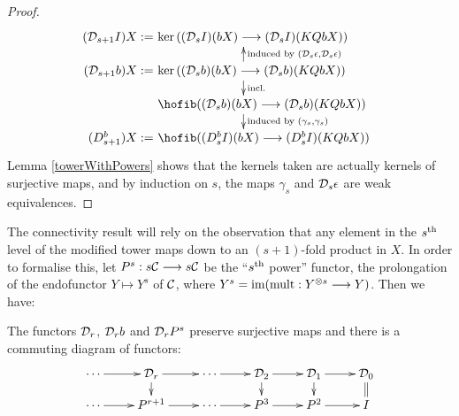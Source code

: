 \documentclass[11pt]{amsart}
\theoremstyle{plain}
\newcommand{\caldup}[1]{\calD_{\smash{#1}}}
\begin{document}
\begin{proof}
\[\qquad \quad \xymatrix@R=4mm{
\makebox[0cm][r]{$(\caldup{s+1}I)X:=\,$}\makebox[5cm][l]{$\,\ker((\caldup{s}I)(bX)\to (\caldup{s}I)(KQbX))$}\\
\makebox[0cm][r]{$(\caldup{s+1}b)X:=\,$}\makebox[5cm][l]{$\,\ker((\caldup{s}b)(bX)\to (\caldup{s}b)(KQbX))$}\ar[d]^-{\textup{incl.}}_-{}%
\ar[u]_-{\textup{induced by }(\caldup{s}\epsilon,\caldup{s}\epsilon)}^-{}%
\\%
\makebox[5cm][l]{$\,\hofib((\caldup{s}b)(bX)\to(\caldup{s}b)(KQbX))$}\ar[d]^-{\textup{induced by }(\gamma_{s},\gamma_{s})}_-{}%
\\%
\makebox[0cm][r]{$(D_{\smash{s+1}}^{\smash{b}})X:=\,$}\makebox[5cm][l]{$\,\hofib((D_{\smash{s}}^{\smash{b}}I)(bX)\to (D_{\smash{s}}^{\smash{b}}I)(KQbX))$}%
}\]
\noindent Lemma \ref{towerWithPowers} shows that the kernels taken are actually kernels of surjective maps, and by induction on $s$, the maps $\gamma_s$ and $\caldup{s}\epsilon$ are weak equivalences.
%
\end{proof}
The connectivity result will rely on the observation that any element in the $s^\textup{th}$ level of the modified tower maps down to an $(s+1)$-fold product in $X$. In order to formalise this, let $P^s:s\calC\to s\calC$ be the ``$s^\textup{th}$ power'' functor, the prolongation of the endofunctor $Y\mapsto Y^s$ of $\calC$, where $Y^s=\textup{im}(\textup{mult}:Y^{\otimes s}\to Y)$. Then we have:
\begin{lem}\label{towerWithPowers}
The functors $\caldup{r}$, $\caldup{r}b$ and $\caldup{r}P^{s}$ preserve surjective maps and there is a commuting diagram of functors:
\[\xymatrix@R=4mm{
\cdots 
\ar[r]
&%
\caldup{r}
\ar[r]
\ar[d]
&%
\cdots \ar[r]
&%
\caldup{2}
\ar[r]
\ar[d]
&%
\caldup{1}
\ar[r]
\ar[d]&%
\caldup{0}
\ar@{=}[d]
\\%
\cdots
\ar[r]
&%
P^{r+1}
\ar[r]
&%
\cdots 
\ar[r]&%
P^3
\ar[r]
&P^2
\ar[r]
&%
I%
}\]
\end{lem}
\end{document}
